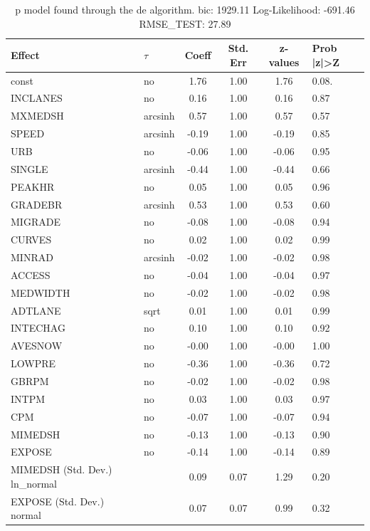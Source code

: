 \begin{table}
	\caption{p model found through the de algorithm. bic: 1929.11 Log-Likelihood: -691.46 RMSE_TEST: 27.89}
	\begin{center}
		\begin{tabular}{|l|l|c|c|c|l|}
			\hline
			Effect & $\tau$ & Coeff & Std. Err & z-values & Prob |z|>Z \\
			\hline
			const & no & 1.76 & 1.00 & 1.76 & 0.08. \\
			\hline
			INCLANES & no & 0.16 & 1.00 & 0.16 & 0.87 \\
			\hline
			MXMEDSH & arcsinh & 0.57 & 1.00 & 0.57 & 0.57 \\
			\hline
			SPEED & arcsinh & -0.19 & 1.00 & -0.19 & 0.85 \\
			\hline
			URB & no & -0.06 & 1.00 & -0.06 & 0.95 \\
			\hline
			SINGLE & arcsinh & -0.44 & 1.00 & -0.44 & 0.66 \\
			\hline
			PEAKHR & no & 0.05 & 1.00 & 0.05 & 0.96 \\
			\hline
			GRADEBR & arcsinh & 0.53 & 1.00 & 0.53 & 0.60 \\
			\hline
			MIGRADE & no & -0.08 & 1.00 & -0.08 & 0.94 \\
			\hline
			CURVES & no & 0.02 & 1.00 & 0.02 & 0.99 \\
			\hline
			MINRAD & arcsinh & -0.02 & 1.00 & -0.02 & 0.98 \\
			\hline
			ACCESS & no & -0.04 & 1.00 & -0.04 & 0.97 \\
			\hline
			MEDWIDTH & no & -0.02 & 1.00 & -0.02 & 0.98 \\
			\hline
			ADTLANE & sqrt & 0.01 & 1.00 & 0.01 & 0.99 \\
			\hline
			INTECHAG & no & 0.10 & 1.00 & 0.10 & 0.92 \\
			\hline
			AVESNOW & no & -0.00 & 1.00 & -0.00 & 1.00 \\
			\hline
			LOWPRE & no & -0.36 & 1.00 & -0.36 & 0.72 \\
			\hline
			GBRPM & no & -0.02 & 1.00 & -0.02 & 0.98 \\
			\hline
			INTPM & no & 0.03 & 1.00 & 0.03 & 0.97 \\
			\hline
			CPM & no & -0.07 & 1.00 & -0.07 & 0.94 \\
			\hline
			MIMEDSH & no & -0.13 & 1.00 & -0.13 & 0.90 \\
			\hline
			EXPOSE & no & -0.14 & 1.00 & -0.14 & 0.89 \\
			\hline
			MIMEDSH (Std. Dev.) ln_normal &  & 0.09 & 0.07 & 1.29 & 0.20 \\
			\hline
			EXPOSE (Std. Dev.) normal &  & 0.07 & 0.07 & 0.99 & 0.32 \\
			\hline
		\end{tabular}
	\end{center}
\end{table}